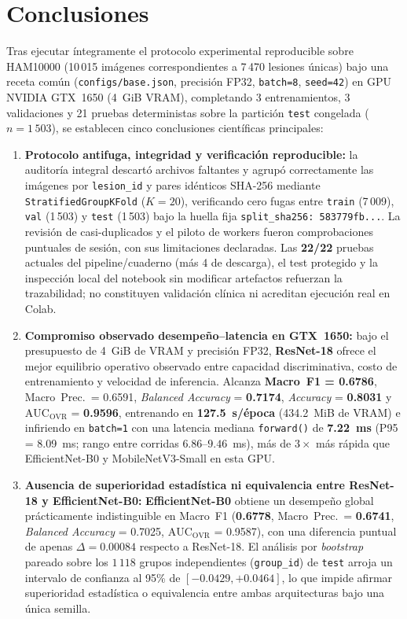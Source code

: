 \FloatBarrier\section{Conclusiones}
\label{sec:conclusiones}

Tras ejecutar íntegramente el protocolo experimental reproducible sobre HAM10000 (10\,015 imágenes correspondientes a 7\,470 lesiones únicas) bajo una receta común (\texttt{configs/base.json}, precisión FP32, \texttt{batch=8}, \texttt{seed=42}) en GPU NVIDIA GTX~1650 (4~GiB VRAM), completando 3 entrenamientos, 3 validaciones y 21 pruebas deterministas sobre la partición \texttt{test} congelada ($n=1\,503$), se establecen cinco conclusiones científicas principales:

\begin{enumerate}[leftmargin=1.5em,itemsep=4pt]
\item \textbf{Protocolo antifuga, integridad y verificación reproducible:} la auditoría integral descartó archivos faltantes y agrupó correctamente las imágenes por \texttt{lesion\_id} y pares idénticos SHA-256 mediante \texttt{StratifiedGroupKFold} ($K=20$), verificando cero fugas entre \texttt{train} (7\,009), \texttt{val} (1\,503) y \texttt{test} (1\,503) bajo la huella fija \texttt{split\_sha256: 583779fb...}. La revisión de casi-duplicados y el piloto de workers fueron comprobaciones puntuales de sesión, con sus limitaciones declaradas. Las \textbf{22/22} pruebas actuales del pipeline/cuaderno (más 4 de descarga), el test protegido y la inspección local del notebook sin modificar artefactos refuerzan la trazabilidad; no constituyen validación clínica ni acreditan ejecución real en Colab.

\item \textbf{Compromiso observado desempeño--latencia en GTX~1650:} bajo el presupuesto de 4~GiB de VRAM y precisión FP32, \textbf{ResNet-18} ofrece el mejor equilibrio operativo observado entre capacidad discriminativa, costo de entrenamiento y velocidad de inferencia. Alcanza \textbf{Macro~F1 = 0.6786}, Macro~Prec.\ = 0.6591, \textit{Balanced Accuracy} = \textbf{0.7174}, \textit{Accuracy} = \textbf{0.8031} y $\mathrm{AUC}_{\mathrm{OVR}}$ = \textbf{0.9596}, entrenando en \textbf{127.5~s/época} (434.2~MiB de VRAM) e infiriendo en \texttt{batch=1} con una latencia mediana \texttt{forward()} de \textbf{7.22~ms} (P95 = 8.09~ms; rango entre corridas $6.86$--$9.46$~ms), más de $3\times$ más rápida que EfficientNet-B0 y MobileNetV3-Small en esta GPU.

\item \textbf{Ausencia de superioridad estadística ni equivalencia entre ResNet-18 y EfficientNet-B0:} \textbf{EfficientNet-B0} obtiene un desempeño global prácticamente indistinguible en Macro~F1 (\textbf{0.6778}, Macro~Prec.\ = \textbf{0.6741}, \textit{Balanced Accuracy} = 0.7025, $\mathrm{AUC}_{\mathrm{OVR}}$ = 0.9587), con una diferencia puntual de apenas $\Delta = 0.00084$ respecto a ResNet-18. El análisis por \textit{bootstrap} pareado sobre los $1\,118$ grupos independientes (\texttt{group\_id}) de \texttt{test} arroja un intervalo de confianza al 95\% de \textbf{$[-0.0429, +0.0464]$}, lo que impide afirmar superioridad estadística o equivalencia entre ambas arquitecturas bajo una única semilla.


\end{enumerate}
